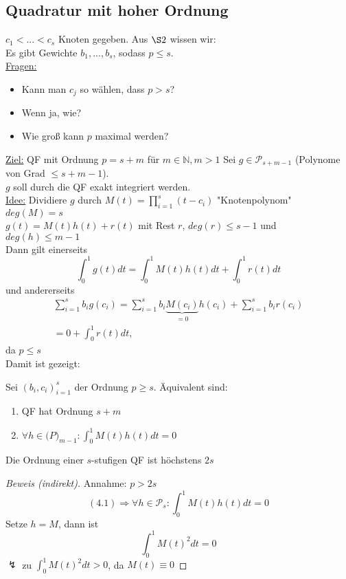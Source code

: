 \subsection{Quadratur mit hoher Ordnung}
$c_1< ... < c_s$ Knoten gegeben. Aus $\S2$ wissen wir: \\
Es gibt Gewichte $b_1, ..., b_s$, sodass $p \leq s$. \\
\underline{Fragen:} 
\begin{itemize}
  \item Kann man $c_j$ so wählen, dass $p>s$?
  \item Wenn ja, wie?
  \item Wie groß kann $p$ maximal werden?
\end{itemize}
\underline{Ziel:} QF mit Ordnung $p=s+m$ für $m \in \mathbb{N}, m > 1$
Sei $g \in \mathcal{P}_{s+m-1}$ (Polynome von Grad $\leq s+m-1$).\\
$g$ soll durch die QF exakt integriert werden.\\
\underline{Idee:} Dividiere $g$ durch $M(t) = \prod_{i=1}^s (t-c_i)$ "Knotenpolynom"\\
$deg(M) = s$ \\
$g(t) = M(t) h(t) + r(t)$ mit Rest $r$, $deg(r) \leq s-1$ und $deg(h) \leq m-1$ \\
Dann gilt einerseits
$$\int_0^1 g(t)dt = \int_0^1 M(t)h(t)dt + \int_0^1r(t)dt$$
und andererseits
\begin{gather*}\sum_{i=1}^s b_ig(c_i) = \sum_{i=1}^s b_i \underbrace{M(c_i)}_{= 0} h(c_i) + \sum_{i=1}^s b_ir(c_i) \\
 = 0 + \int_0^1 r(t)dt,\end{gather*}
 da $p \leq s$\\
Damit ist gezeigt:

\begin{theorem}
Sei $(b_i, c_i)_{i=1}^s$ der Ordnung $p \geq s$. Äquivalent sind:
\begin{enumerate}
  \item QF hat Ordnung $s+m$
  \item $\forall h \in \mathcal(P)_{m-1}:\int_0^1 M(t)h(t)dt = 0$
\end{enumerate}
\end{theorem}

\begin{korollar}
Die Ordnung einer $s$-stufigen QF ist höchstens $2s$
\begin{proof}[Beweis (indirekt)]
Annahme: $p > 2s$ \\
$$(4.1) \Rightarrow \forall h \in \mathcal{P}_s: \int_0^1 M(t)h(t)dt = 0 $$
Setze $h=M$, dann ist $$ \int_0^1 M(t)^2dt = 0$$
$\lightning$ zu $\int_0^1 M(t)^2 dt > 0$, da $M(t) \equiv 0$
\end{proof}
\end{korollar}

